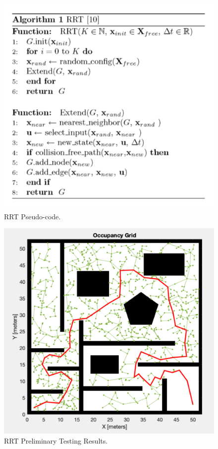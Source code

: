\documentclass[11pt]{article}
\begin{document}
\begin{figure}[H]
    \centering
        \includegraphics[scale=.4, angle =0]{figures/rrt_code.png}
    \caption{RRT Pseudo-code.}
    \label{RRT pseudocode}
\end{figure}

\begin{figure}[H]
    \centering
        \includegraphics[scale=.3, angle =0]{figures/rrt-1.png}
    \caption{RRT Preliminary Testing Results.}
    \label{RRT Prelininary Results.}
\end{figure}
\end{document}
